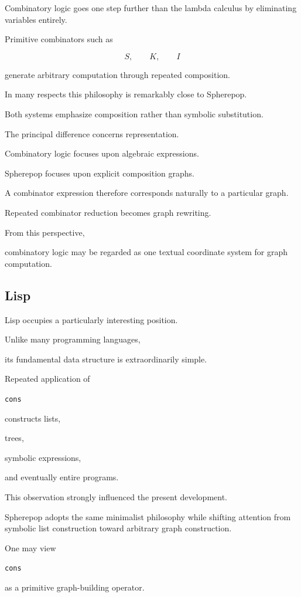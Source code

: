 \documentclass[12pt,oneside]{article}
\begin{document}
Combinatory logic goes one step further than the lambda calculus by eliminating variables entirely.

Primitive combinators such as

\[
S,
\qquad
K,
\qquad
I
\]

generate arbitrary computation through repeated composition.

In many respects this philosophy is remarkably close to Spherepop.

Both systems emphasize composition rather than symbolic substitution.

The principal difference concerns representation.

Combinatory logic focuses upon algebraic expressions.

Spherepop focuses upon explicit composition graphs.

A combinator expression therefore corresponds naturally to a particular graph.

Repeated combinator reduction becomes graph rewriting.

From this perspective,

combinatory logic may be regarded as one textual coordinate system for graph computation.

\subsection{Lisp}

Lisp occupies a particularly interesting position.

Unlike many programming languages,

its fundamental data structure is extraordinarily simple.

Repeated application of

\texttt{cons}

constructs lists,

trees,

symbolic expressions,

and eventually entire programs.

This observation strongly influenced the present development.

Spherepop adopts the same minimalist philosophy while shifting attention from symbolic list construction toward arbitrary graph construction.

One may view

\texttt{cons}

as a primitive graph-building operator.
\end{document}
